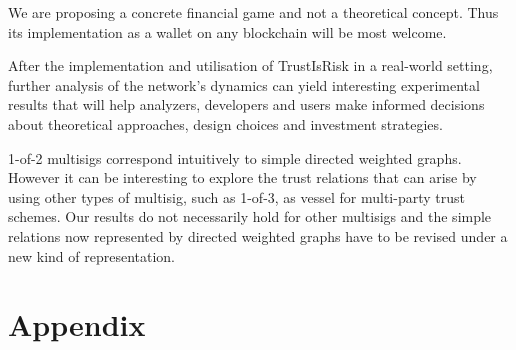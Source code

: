 \documentclass[11pt]{llncs}
\theoremstyle{definition}
\begin{document}
        We are proposing a concrete financial game and not a theoretical concept. Thus its implementation as a wallet on any
        blockchain will be most welcome.

        After the implementation and utilisation of TrustIsRisk in a real-world setting, further analysis of the network's
        dynamics can yield interesting experimental results that will help analyzers, developers and users make informed
        decisions about theoretical approaches, design choices and investment strategies.

        1-of-2 multisigs correspond intuitively to simple directed weighted graphs. However it can be interesting to explore
        the trust relations that can arise by using other types of multisig, such as 1-of-3, as vessel for multi-party trust
        schemes. Our results do not necessarily hold for other multisigs and the simple relations now represented by directed
        weighted graphs have to be revised under a new kind of representation.


  \section*{Appendix}
\end{document}
